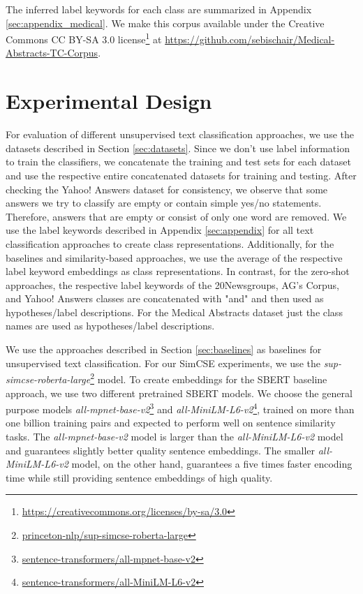 \documentclass[sigconf]{acmart}
\begin{document}
The inferred label keywords for each class are summarized in Appendix \ref{sec:appendix_medical}. We make this corpus available under the Creative Commons CC BY-SA 3.0 license\footnote{\href{https://creativecommons.org/licenses/by-sa/3.0/}{https://creativecommons.org/licenses/by-sa/3.0}} at \url{https://github.com/sebischair/Medical-Abstracts-TC-Corpus}.


\section{Experimental Design}
For evaluation of different unsupervised text classification approaches, we use the datasets described in Section \ref{sec:datasets}. Since we don't use label information to train the classifiers, we concatenate the training and test sets for each dataset and use the respective entire concatenated datasets for training and testing. After checking the Yahoo! Answers dataset for consistency, we observe that some answers we try to classify are empty or contain simple yes/no statements. Therefore, answers that are empty or consist of only one word are removed. We use the label keywords described in Appendix \ref{sec:appendix} for all text classification approaches to create class representations. Additionally, for the baselines and similarity-based approaches, we use the average of the respective label keyword embeddings as class representations. In contrast, for the zero-shot approaches, the respective label keywords of the 20Newsgroups, AG's Corpus, and Yahoo! Answers classes are concatenated with "and" and then used as hypotheses/label descriptions. For the Medical Abstracts dataset just the class names are used as hypotheses/label descriptions. 

We use the approaches described in Section \ref{sec:baselines} as baselines for unsupervised text classification. For our SimCSE experiments, we use the \textit{
sup-simcse-roberta-large}\footnote{\href{https://huggingface.co/princeton-nlp/sup-simcse-roberta-large}{princeton-nlp/sup-simcse-roberta-large}} model. To create embeddings for the SBERT baseline approach, we use two different pretrained SBERT models. We choose the general purpose models \textit{all-mpnet-base-v2}\footnote{\href{https://huggingface.co/sentence-transformers/all-mpnet-base-v2}{sentence-transformers/all-mpnet-base-v2}} and \textit{all-MiniLM-L6-v2}\footnote{\href{https://huggingface.co/sentence-transformers/all-MiniLM-L6-v2}{sentence-transformers/all-MiniLM-L6-v2}}, trained on more than one billion training pairs and expected to perform well on sentence similarity tasks. The \textit{all-mpnet-base-v2} model is larger than the  \textit{all-MiniLM-L6-v2} model and guarantees slightly better quality sentence embeddings. The smaller \textit{all-MiniLM-L6-v2} model, on the other hand, guarantees a five times faster encoding time while still providing sentence embeddings of high quality. 
\end{document}
